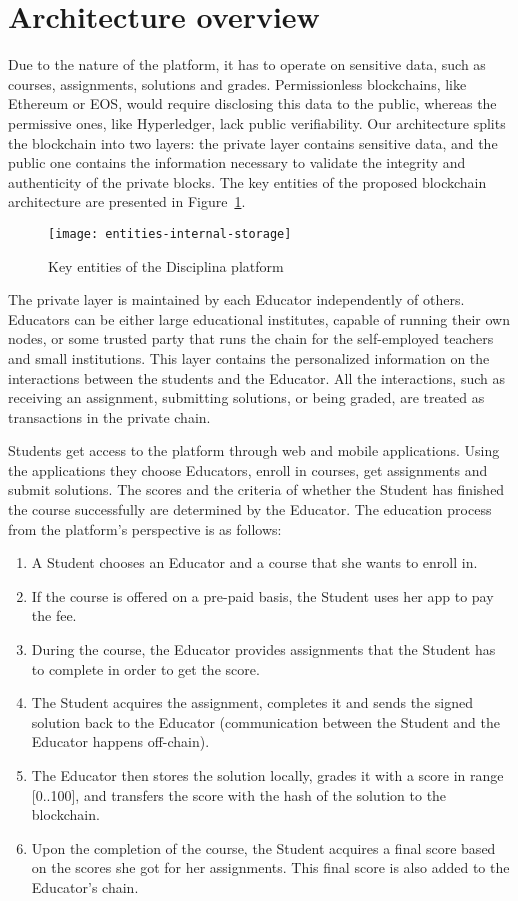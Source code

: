 \section{Architecture overview}
\label{sec:architecture}

Due to the nature of the platform, it has to operate on sensitive data, such as courses, assignments, solutions and grades. Permissionless blockchains, like Ethereum or EOS, would require disclosing this data to the public, whereas the permissive ones, like Hyperledger, lack public verifiability. Our architecture splits the blockchain into two layers: the private layer contains sensitive data, and the public one contains the information necessary to validate the integrity and authenticity of the private blocks. The key entities of the proposed blockchain architecture are presented in Figure~\ref{fig:entities}.

\begin{figure}[ht]
\centering
\texttt{[image: entities-internal-storage]}
\caption{Key entities of the Disciplina platform}
\label{fig:entities}
\end{figure}

The private layer is maintained by each Educator independently of others. Educators can be either large educational institutes, capable of running their own nodes, or some trusted party that runs the chain for the self-employed teachers and small institutions. This layer contains the personalized information on the interactions between the students and the Educator. All the interactions, such as receiving an assignment, submitting solutions, or being graded, are treated as transactions in the private chain.

Students get access to the platform through web and mobile applications. Using the applications they choose Educators, enroll in courses, get assignments and submit solutions. The scores and the criteria of whether the Student has finished the course successfully are determined by the Educator. The education process from the platform’s perspective is as follows:
\begin{enumerate}
\item A Student chooses an Educator and a course that she wants to enroll in.
\item If the course is offered on a pre-paid basis, the Student uses her app to pay the fee.
\item During the course, the Educator provides assignments that the Student has to complete in order to get the score.
\item The Student acquires the assignment, completes it and sends the signed solution back to the Educator (communication between the Student and the Educator happens off-chain).
\item The Educator then stores the solution locally, grades it with a score in range [0..100],  and transfers the score with the hash of the solution to the blockchain.
\item Upon the completion of the course, the Student acquires a final score based on the scores she got for her assignments. This final score is also added to the Educator’s chain.
\end{enumerate}

